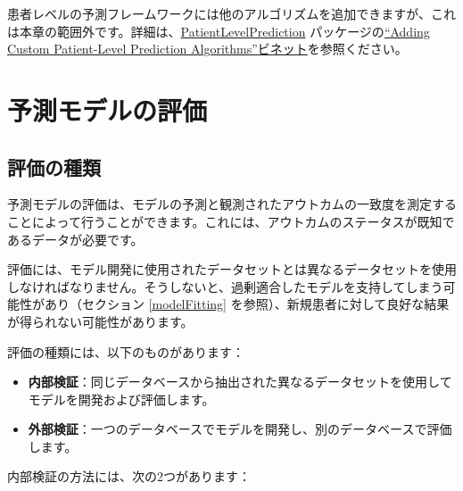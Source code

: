 \documentclass[
  11pt]{book}
\makeatletter
\providecommand{\tightlist}{%
  \setlength{\itemsep}{0pt}\setlength{\parskip}{0pt}}
\newenvironment{kframe}{%
\medskip{}
\setlength{\fboxsep}{.8em}
 \def\at@end@of@kframe{}%
 \ifinner\ifhmode%
  \def\at@end@of@kframe{\end{minipage}}%
  \begin{minipage}{\columnwidth}%
 \fi\fi%
 \def\FrameCommand##1{\hskip\@totalleftmargin \hskip-\fboxsep
 \colorbox{myShadeColor}{##1}\hskip-\fboxsep
     \hskip-\linewidth \hskip-\@totalleftmargin \hskip\columnwidth}%
 \MakeFramed {\advance\hsize-\width
   \@totalleftmargin\z@ \linewidth\hsize
   \@setminipage}}%
 {\par\unskip\endMakeFramed%
 \at@end@of@kframe}
\newenvironment{rmdblock}[1]
  {
  \begin{itemize}
  \renewcommand{\labelitemi}{
    \raisebox{-.7\height}[0pt][0pt]{
      {\setkeys{Gin}{width=3em,keepaspectratio}\texttt{[image: images/\#1]}}
    }
  }
  \setlength{\fboxsep}{1em}
  \begin{kframe}
  \item
  }
  {
  \end{kframe}
  \end{itemize}
  }
\newenvironment{rmdimportant}
  {\begin{rmdblock}{important}}
  {\end{rmdblock}}
\theoremstyle{definition}
\theoremstyle{definition}
\theoremstyle{definition}
\theoremstyle{definition}
\theoremstyle{remark}
\makeatother
\begin{document}
患者レベルの予測フレームワークには他のアルゴリズムを追加できますが、これは本章の範囲外です。詳細は、\href{https://ohdsi.github.io/PatientLevelPrediction/}{PatientLevelPrediction} パッケージの\href{https://ohdsi.github.io/PatientLevelPrediction/articles/AddingCustomAlgorithms.html}{``Adding Custom Patient-Level Prediction Algorithms''ビネット}を参照ください。

\section{予測モデルの評価}\label{ux4e88ux6e2cux30e2ux30c7ux30ebux306eux8a55ux4fa1}

\subsection{評価の種類}\label{ux8a55ux4fa1ux306eux7a2eux985e}

予測モデルの評価は、モデルの予測と観測されたアウトカムの一致度を測定することによって行うことができます。これには、アウトカムのステータスが既知であるデータが必要です。 

\begin{rmdimportant}
評価には、モデル開発に使用されたデータセットとは異なるデータセットを使用しなければなりません。そうしないと、過剰適合したモデルを支持してしまう可能性があり（セクション \ref{modelFitting} を参照）、新規患者に対して良好な結果が得られない可能性があります。
\end{rmdimportant}

評価の種類には、以下のものがあります：

\begin{itemize}
\tightlist
\item
  \textbf{内部検証}：同じデータベースから抽出された異なるデータセットを使用してモデルを開発および評価します。
\item
  \textbf{外部検証}：一つのデータベースでモデルを開発し、別のデータベースで評価します。  
\end{itemize}

内部検証の方法には、次の2つがあります：
\end{document}
